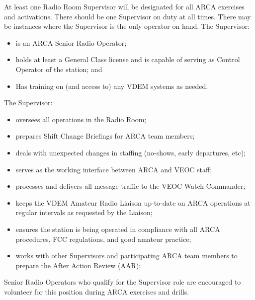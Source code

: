\documentclass[pdflatex,letterpaper,twoside,12pt]{book}
\begin{document}
At least one Radio Room Supervisor will be designated for all ARCA exercises and activations.  There should be one Supervisor on duty at all times.  There may be instances where the Supervisor is the only operator on hand.  The Supervisor:

\begin{itemize}
	\item is an ARCA Senior Radio Operator;
	\item holds at least a General Class license and is capable of serving as Control Operator of the station; and
	\item Has training on (and access to) any VDEM systems as needed.
\end{itemize}

The Supervisor:

\begin{itemize}
	\item oversees all operations in the Radio Room;
	\item prepares Shift Change Briefings for ARCA team members;
	\item deals with unexpected changes in staffing (no-shows, early departures, etc);
	\item serves as the working interface between ARCA and VEOC staff;
	\item processes and delivers all message traffic to the VEOC Watch Commander;
	\item keeps the VDEM Amateur Radio Liaison up-to-date on ARCA operations at regular intervals as requested by the Liaison;
	\item ensures the station is being operated in compliance with all ARCA procedures, FCC regulations, and good amateur practice;
	\item works with other Supervisors and participating ARCA team members to prepare the After Action Review (AAR);
\end{itemize}

Senior Radio Operators who qualify for the Supervisor role are encouraged to volunteer for this position during ARCA exercises and drills.

\end{document}

